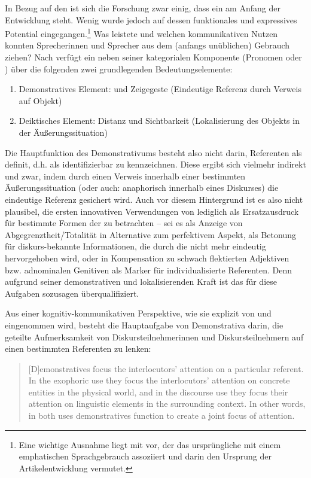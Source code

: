 In Bezug auf den  ist sich die Forschung zwar einig, dass ein  am Anfang der Entwicklung steht. Wenig wurde jedoch auf dessen funktionales und expressives Potential eingegangen.\footnote{Eine wichtige Ausnahme liegt mit \textcite[16--17]{Hodler1954} vor, der das ursprüngliche  mit einem emphatischen Sprachgebrauch assoziiert und darin den Ursprung der Artikelentwicklung vermutet.} Was leistete  und welchen kommunikativen Nutzen konnten Sprecherinnen und Sprecher aus dem (anfangs unüblichen) Gebrauch ziehen? Nach \textcite[40]{Lehmann2015} verfügt ein  neben seiner kategorialen Komponente (Pronomen oder ) über die folgenden zwei grundlegenden Bedeutungselemente:

\begin{enumerate}
\item Demonstratives Element:  und Zeigegeste (Eindeutige Referenz durch  Verweis auf Objekt)  
\item Deiktisches Element:  Distanz und Sichtbarkeit (Lokalisierung des Objekts in der Äußerungssituation)
\end{enumerate}
\noindent
Die Hauptfunktion des Demonstrativums  besteht also  nicht darin, Referenten als definit, d.h. als identifizierbar zu kennzeichnen. Diese ergibt sich vielmehr indirekt und zwar, indem durch einen Verweis innerhalb einer bestimmten Äußerungssituation (oder auch: anaphorisch  innerhalb eines Diskurses) die eindeutige Referenz  gesichert wird. Auch vor diesem Hintergrund ist es also nicht plausibel, die ersten innovativen Verwendungen von  lediglich als Ersatzausdruck für bestimmte Formen der  zu betrachten -- sei es als Anzeige von Abgegrenztheit/Totalität in Alternative zum perfektivem  Aspekt, als Betonung für diskurs-bekannte Informationen, die durch die  nicht mehr eindeutig hervorgehoben wird, oder in Kompensation zu schwach flektierten Adjektiven bzw. adnominalen Genitiven  als Marker für individualisierte  Referenten. Denn aufgrund seiner demonstrativen und lokalisierenden Kraft ist das  für diese Aufgaben sozusagen überqualifiziert. 

Aus einer kognitiv-kommunikativen Perspektive, wie sie explizit von \textcite{Epstein1993,Epstein1994} und \textcite{Diessel2006} eingenommen wird, besteht die Hauptaufgabe von Demonstrativa  darin, die geteilte Aufmerksamkeit von Diskursteilnehmerinnen und Diskursteilnehmern auf einen bestimmten Referenten zu lenken: \blockcquote[476]{Diessel2006}{[D]emonstratives
focus the interlocutors’ attention on a particular referent. In the
exophoric use they focus the interlocutors’ attention on concrete entities
in the physical world, and in the discourse use they focus their attention
on linguistic elements in the surrounding context. In other words, in both
uses demonstratives function to create a joint focus of attention.}

